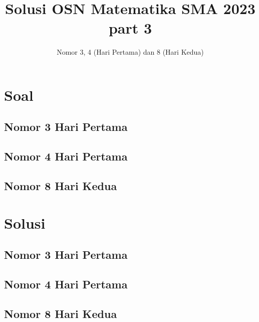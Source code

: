 \documentclass[12pt]{scrartcl}
\title{Solusi OSN Matematika SMA 2023\\ part 3}
\author{Nomor 3, 4 (Hari Pertama) dan 8 (Hari Kedua)}
\date{}
\begin{document}
\maketitle

\renewcommand*\contentsname{Daftar Isi}
\tableofcontents

\newpage
\newpage
\section{Soal}
\subsection{Nomor 3 Hari Pertama}

\subsection{Nomor 4 Hari Pertama}

\subsection{Nomor 8 Hari Kedua}


\newpage

\section{Solusi}
\subsection{Nomor 3 Hari Pertama}

\subsection{Nomor 4 Hari Pertama}

\subsection{Nomor 8 Hari Kedua}

\end{document}
